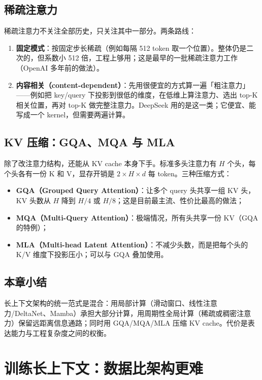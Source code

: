 \documentclass[a4paper]{article}
\begin{document}
\subsection{稀疏注意力}

稀疏注意力不关注全部历史，只关注其中一部分。两条路线：

\begin{enumerate}
\item \textbf{固定模式}：按固定步长稀疏（例如每隔 512 token 取一个位置）。整体仍是二次的，但系数小 512 倍，工程上够用；这是最早的一批稀疏注意力工作（OpenAI 多年前的做法）。
\item \textbf{内容相关（content-dependent）}：先用很便宜的方式算一遍「粗注意力」——例如把 key/query 下投影到很低的维度，在低维上算注意力、选出 top-K 相关位置，再对 top-K 做完整注意力。DeepSeek 用的是这一类；它便宜、能写成一个 kernel，但需要两遍计算。
\end{enumerate}

\subsection{KV 压缩：GQA、MQA 与 MLA}

除了改注意力结构，还能从 KV cache 本身下手。标准多头注意力有 $H$ 个头，每个头各有一份 K 和 V，显存开销是 $2\times H \times d$ 每 token。三种压缩方式：

\begin{itemize}
\item \textbf{GQA（Grouped Query Attention）}：让多个 query 头共享一组 KV 头，KV 头数从 $H$ 降到 $H/4$ 或 $H/8$；这是目前最主流、性价比最高的做法；
\item \textbf{MQA（Multi-Query Attention）}：极端情况，所有头共享一份 KV（GQA 的特例）；
\item \textbf{MLA（Multi-head Latent Attention）}：不减少头数，而是把每个头的 K/V 维度下投影压小；可以与 GQA 叠加使用。
\end{itemize}

\subsection{本章小结}
长上下文架构的统一范式是混合：用局部计算（滑动窗口、线性注意力/DeltaNet、Mamba）承担大部分计算，用周期性全局计算（稀疏或稠密注意力）保留远距离信息通路；同时用 GQA/MQA/MLA 压缩 KV cache。代价是表达能力与工程复杂度之间的权衡。

\section{训练长上下文：数据比架构更难}
\end{document}
